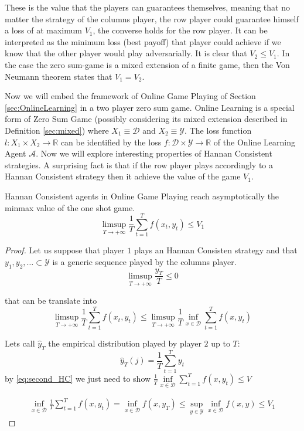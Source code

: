 These is the value that the players can guarantees themselves, meaning that no matter the strategy of the columns player, the row player could guarantee himself a loss of at maximum $V_1$, the converse holds for the row player. It can be interpreted as the minimum loss (best payoff) that player could achieve if we know that the other player would play adversarially. It is clear that $V_2\le V_1$. In the case the zero sum-game is a mixed extension of a finite game, then the Von Neumann theorem states that $V_1=V_2$.
 
Now we will embed the framework of Online Game Playing of Section \ref{sec:OnlineLearning} in a two player zero sum game. 
Online Learning is a special form of Zero Sum Game (possibly considering its mixed extension described in Definition \ref{sec:mixed}) where $X_1\equiv \mathcal D$ and $X_2\equiv \mathcal Y$. The loss function $l:X_1\times X_2\to\mathbb R$ can be identified by the loss $f:\mathcal D\times \mathcal Y\to\mathbb R$ of the Online Learning Agent $\mathcal A$.
Now we will explore interesting properties of Hannan Consistent strategies. A surprising fact is that if the row player plays accordingly to a Hannan Consistent strategy then it achieve the value of the game $V_1$. 

\begin{theorem}
    Hannan Consistent agents in Online Game Playing reach asymptotically the minmax value of the one shot game.
    $$\limsup\limits_{T\to +\infty}\frac{1}{T}\sum\limits_{t=1}^Tf(x_t,y_t)\le V_1$$
\end{theorem}

\begin{proof}
    Let us suppose that player $1$ plays an Hannan Consisten strategy and that $y_1,y_2,\ldots \subset \mathcal Y$ is a generic sequence played by the columns player.
    \begin{equation}
        \limsup\limits_{T\to+\infty}\frac{y_T}{T}\le0
    \end{equation}
    
    that can be translate into 
    \begin{equation}\label{eq:second_HC}
        \limsup\limits_{T\to+\infty}\frac{1}{T}\sum\limits_{t=1}^Tf(x_t,y_t)\le\limsup\limits_{T\to+\infty}\frac{1}{T}\inf\limits_{x\in\mathcal D}\sum\limits_{t=1}^Tf(x,y_t)
    \end{equation}

    Lets call $\hat y_T$ the empirical distribution played by player $2$ up to $T$:
    $$\hat y_T(j)=\frac{1}{T}\sum\limits_{t=1}^Ty_t$$
    by \eqref{eq:second_HC} we just need to show $\frac{1}{T}\inf\limits_{x\in \mathcal D} \sum\limits_{t=1}^T f(x,y_t)\le V$

    \begin{align}
        \inf\limits_{x\in\mathcal D}\frac{1}{T}\sum\limits_{t=1}^T f(x,y_t)=\inf\limits_{x\in\mathcal D} f(x,y_T)\le\sup\limits_{y\in\mathcal Y}\inf\limits_{x\in\mathcal D} f(x,y)\le V_1
    \end{align}
\end{proof}

